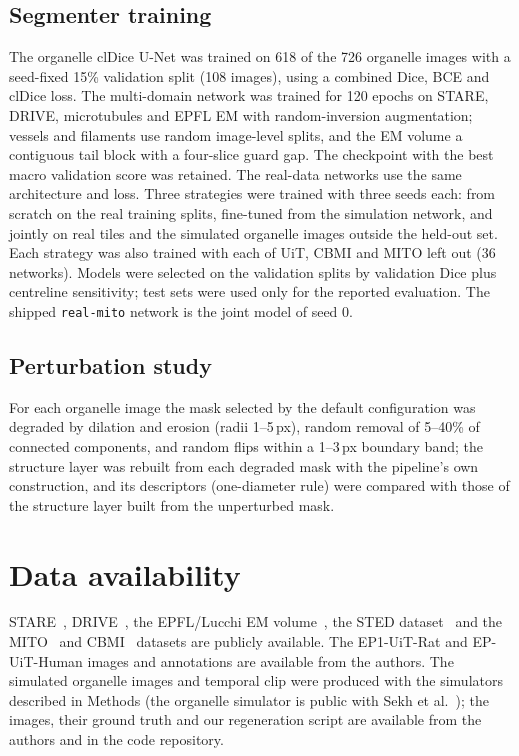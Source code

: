 \documentclass[10pt,a4paper]{article}
\begin{document}
\subsection{Segmenter training}
The organelle clDice U-Net was trained on 618 of the 726 organelle images
with a seed-fixed 15\% validation split (108 images), using a combined
Dice, BCE and clDice loss. The multi-domain network was trained for 120
epochs on STARE, DRIVE, microtubules and EPFL EM with random-inversion
augmentation; vessels and filaments use random image-level splits, and the
EM volume a contiguous tail block with a four-slice guard gap. The
checkpoint with the best macro validation score was retained. The real-data networks
use the same architecture and loss. Three strategies were trained with
three seeds each: from scratch on the real training splits, fine-tuned from
the simulation network, and jointly on real tiles and the simulated
organelle images outside the held-out set. Each strategy was also trained
with each of UiT, CBMI and MITO left out (36 networks). Models were
selected on the validation splits by validation Dice plus centreline
sensitivity; test sets were used only for the reported evaluation. The
shipped \texttt{real-mito} network is the joint model of seed 0.

\subsection{Perturbation study}
For each organelle image the mask selected by the default configuration was
degraded by dilation and erosion (radii 1--5\,px), random removal of 5--40\%
of connected components, and random flips within a 1--3\,px boundary band;
the structure layer was rebuilt from each degraded mask with the
pipeline's own construction, and its descriptors (one-diameter rule) were
compared with those of the structure layer built from the unperturbed
mask.

\section*{Data availability}
STARE~\cite{stare}, DRIVE~\cite{drive}, the EPFL/Lucchi EM
volume~\cite{lucchi}, the STED dataset~\cite{balakrishnan2024sted} and the
MITO~\cite{zhanghao2023mito} and CBMI~\cite{cbmi} datasets are publicly
available. The EP1-UiT-Rat and EP-UiT-Human images and annotations are
available from the authors. The simulated
organelle images and temporal clip were produced with the simulators described
in Methods (the organelle simulator is public with Sekh et
al.~\cite{sekh2021}); the images, their ground truth and our regeneration
script are available from the authors and in the code repository.
\end{document}
